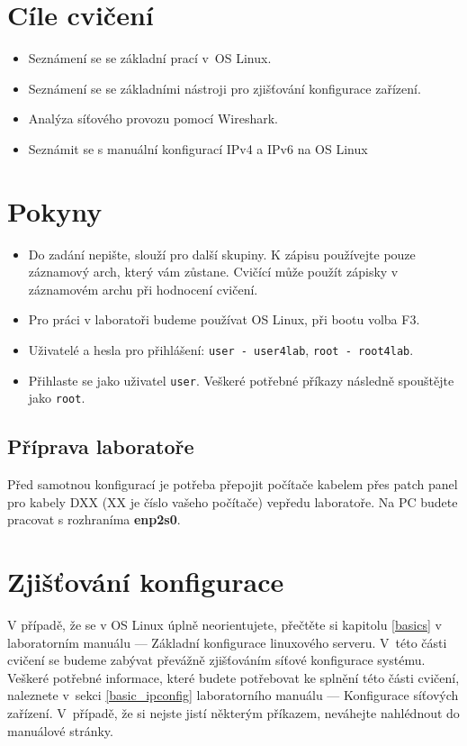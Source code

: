\section*{Cíle cvičení}
\begin{itemize}
	\item Seznámení se se základní prací v~OS Linux.
	\item Seznámení se se základními nástroji pro zjišťování konfigurace zařízení.
	\item Analýza síťového provozu pomocí Wireshark.
	\item Seznámit se s manuální konfigurací IPv4 a IPv6 na OS Linux
\end{itemize}

\section*{Pokyny}
\begin{itemize}
\item Do zadání nepište, slouží pro další skupiny. K zápisu používejte pouze
  záznamový arch, který vám zůstane. Cvičící může použít zápisky v záznamovém
    archu při hodnocení cvičení.
\item Pro práci v laboratoři budeme používat OS Linux, při bootu volba F3.
\item Uživatelé a hesla pro přihlášení: \texttt{user - user4lab}, \texttt{root - root4lab}.
\item Přihlaste se jako uživatel \texttt{user}. Veškeré potřebné příkazy následně spouštějte jako \texttt{root}.
\end{itemize}

\subsection*{Příprava laboratoře}
Před samotnou konfigurací je potřeba přepojit počítače kabelem přes patch panel
pro kabely DXX (XX je číslo vašeho počítače) vepředu laboratoře. Na PC budete
pracovat s rozhraníma {\bf enp2s0}.

\section{Zjišťování konfigurace}
V případě, že se v OS Linux úplně neorientujete, přečtěte si kapitolu \ref{basics} v
laboratorním manuálu --- Základní konfigurace linuxového serveru. V~této části cvičení se
budeme zabývat převážně zjišťováním síťové konfigurace systému. Veškeré potřebné
informace, které budete potřebovat ke splnění této části cvičení, naleznete
v~sekci \ref{basic_ipconfig} laboratorního manuálu --- Konfigurace síťových zařízení. V~případě, že si nejste jistí některým příkazem, neváhejte nahlédnout do manuálové stránky.

